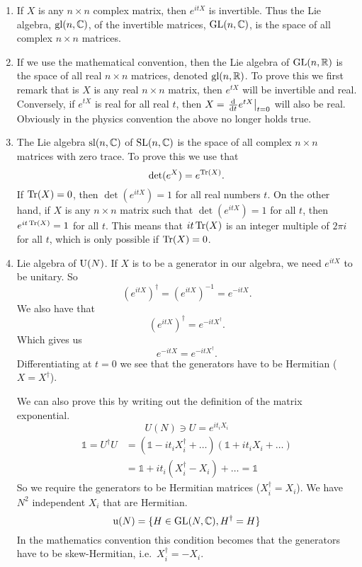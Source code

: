 \begin{example}
\begin{enumerate}
\item If $X$ is any $n\times n$ complex matrix, then $e^{itX}$ is invertible. Thus the Lie algebra, $\operatorname{gl}(n,\mathbb{C})$, of the invertible matrices, $\operatorname{GL}(n,\mathbb{C})$, is the space of all complex $n\times n$ matrices.
\item If we use the mathematical convention, then the Lie algebra of $\operatorname{GL}(n,\mathbb{R})$ is the space of all real $n\times n$ matrices, denoted $\operatorname{gl}(n,\mathbb{R})$. To prove this we first remark that is $X$ is any real $n\times n$ matrix, then $e^{tX}$ will be invertible and real. Conversely, if $e^{tX}$ is real for all real $t$, then $X=\left.\od{}{t}e^{tX}\right|_{t=0}$ will also be real. Obviously in the physics convention the above no longer holds true.

\item The Lie algebra $\operatorname{sl}(n,\mathbb{C})$ of $\operatorname{SL}(n,\mathbb{C})$ is the space of all complex $n \times n$ matrices with zero trace. To prove this we use that
\[ \det(e^X) = e^{\operatorname{Tr}(X)}. \]
If $\operatorname{Tr}(X) = 0$, then $\det(e^{itX}) = 1$ for all real numbers $t$. On the other hand, if $X$ is any $n\times n$ matrix such that $\det(e^{itX}) =1$ for all $t$, then $e^{it\operatorname{Tr}(X)} = 1$ for all $t$. This means that $it\operatorname{Tr}(X)$ is an integer multiple of $2\pi i$ for all $t$, which is only possible if $\operatorname{Tr}(X) = 0$.

\item Lie algebra of $\operatorname{U}(N)$. If $X$ is to be a generator in our algebra, we need $e^{itX}$ to be unitary. So
\[ \left(e^{itX}\right)^\dagger = \left(e^{itX}\right)^{-1} = e^{-itX}. \]
We also have that
\[ \left(e^{itX}\right)^\dagger = e^{-itX^\dagger}. \]
Which gives us
\[ e^{-itX} = e^{-itX^\dagger}. \]
Differentiating at $t=0$ we see that the generators have to be Hermitian ($X = X^\dagger$).

We can also prove this by writing out the definition of the matrix exponential. 
\[ U(N) \ni U = e^{it_iX_i} \]
\begin{align}
\mathbb{1} = U^\dagger U &= (\mathbb{1}-it_i X_i^\dagger + \ldots )(\mathbb{1}+it_i X_i + \ldots) \\
&= \mathbb{1} + it_i(X_i^\dagger - X_i) + \ldots = \mathbb{1}
\end{align}
So we require the generators to be Hermitian matrices ($X_i^\dagger = X_i$). We have $N^2$ independent $X_i$ that are Hermitian. 
\[ \operatorname{u}(N) = \{ H \in \operatorname{GL}(N,\mathbb{C}), H^\dagger = H \} \]
In the mathematics convention this condition becomes that the generators have to be skew-Hermitian, i.e.\ $X_i^\dagger = -X_i$.


\end{enumerate}
\end{example}
